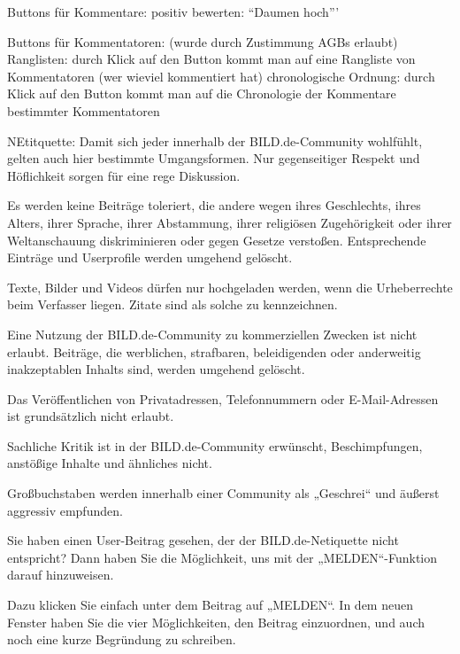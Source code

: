 Buttons für Kommentare: 
	positiv bewerten: ``Daumen hoch'''
	
	

Buttons für Kommentatoren:  (wurde durch Zustimmung AGBs erlaubt)
	Ranglisten: durch Klick auf den Button kommt man auf eine Rangliste von Kommentatoren (wer wieviel kommentiert hat)
	chronologische Ordnung: durch Klick auf den Button kommt man auf die Chronologie der Kommentare bestimmter Kommentatoren

NEtitquette:
Damit sich jeder innerhalb der BILD.de-Community wohlfühlt, gelten auch hier bestimmte Umgangsformen. Nur gegenseitiger Respekt und Höflichkeit sorgen für eine rege Diskussion.

Es werden keine Beiträge toleriert, die andere wegen ihres Geschlechts, ihres Alters, ihrer Sprache, ihrer Abstammung, ihrer religiösen Zugehörigkeit oder ihrer Weltanschauung diskriminieren oder gegen Gesetze verstoßen. Entsprechende Einträge und Userprofile werden umgehend gelöscht.

Texte, Bilder und Videos dürfen nur hochgeladen werden, wenn die Urheberrechte beim Verfasser liegen. Zitate sind als solche zu kennzeichnen.

Eine Nutzung der BILD.de-Community zu kommerziellen Zwecken ist nicht erlaubt. Beiträge, die werblichen, strafbaren, beleidigenden oder anderweitig inakzeptablen Inhalts sind, werden umgehend gelöscht.

Das Veröffentlichen von Privatadressen, Telefonnummern oder E-Mail-Adressen ist grundsätzlich nicht erlaubt.

Sachliche Kritik ist in der BILD.de-Community erwünscht, Beschimpfungen, anstößige Inhalte und ähnliches nicht.

Großbuchstaben werden innerhalb einer Community als „Geschrei“ und äußerst aggressiv empfunden.

Sie haben einen User-Beitrag gesehen, der der BILD.de-Netiquette nicht entspricht? Dann haben Sie die Möglichkeit, uns mit der „MELDEN“-Funktion darauf hinzuweisen.

Dazu klicken Sie einfach unter dem Beitrag auf „MELDEN“. In dem neuen Fenster haben Sie die vier Möglichkeiten, den Beitrag einzuordnen, und auch noch eine kurze Begründung zu schreiben.
